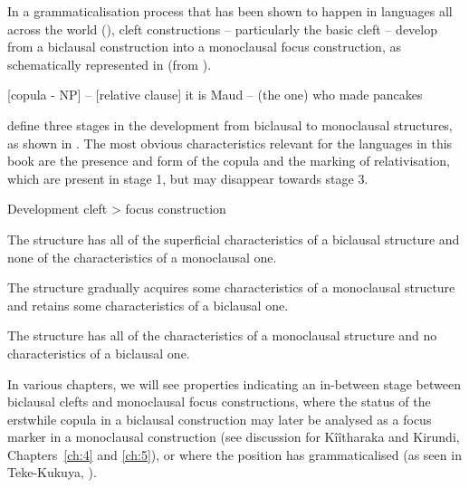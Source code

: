 \documentclass[output=paper]{langscibook}
\begin{document}
In a grammaticalisation process that has been shown to happen in languages all across the world (\citealt{HarrisCampbell1995,HeineTraugott1991}), cleft constructions – particularly the basic cleft – develop from a biclausal construction into a monoclausal focus construction, as schematically represented in  (from \citealt[9]{vanderWalManiacky2015}).

\ea
\label{bkm:Ref122688512}
\settowidth{\jamwidth}{ > MAUD made pancakes}
{[copula \nobreakdash- NP] -- [relative clause]}  
  {it is Maud -- (the one) who made pancakes}  

\z

\citet{HarrisCampbell1995} define three stages in the development from biclausal to monoclausal structures, as shown in . The most obvious characteristics relevant for the languages in this book are the presence and form of the copula and the marking of relativisation, which are present in stage 1, but may disappear towards stage 3. 

\ea
\label{bkm:Ref122688490}Development cleft > focus construction \citep[166]{HarrisCampbell1995}

\begin{xlist}[Stage 3:]
 The structure has all of the superficial characteristics of a biclausal structure and none of the characteristics of a monoclausal one.

 The structure gradually acquires some characteristics of a monoclausal structure and retains some characteristics of a biclausal one.

 The structure has all of the characteristics of a monoclausal structure and no characteristics of a biclausal one.
\end{xlist}
\z

In various chapters, we will see properties indicating an in-between stage between biclausal clefts and monoclausal focus constructions, where the status of the erstwhile copula in a biclausal construction may later be analysed as a focus marker in a monoclausal construction (see discussion for Kîîtharaka and Kirundi, Chapters~\ref{ch:4} and \ref{ch:5}), or where the position has grammaticalised (as seen in Teke-Kukuya, ).
\end{document}
